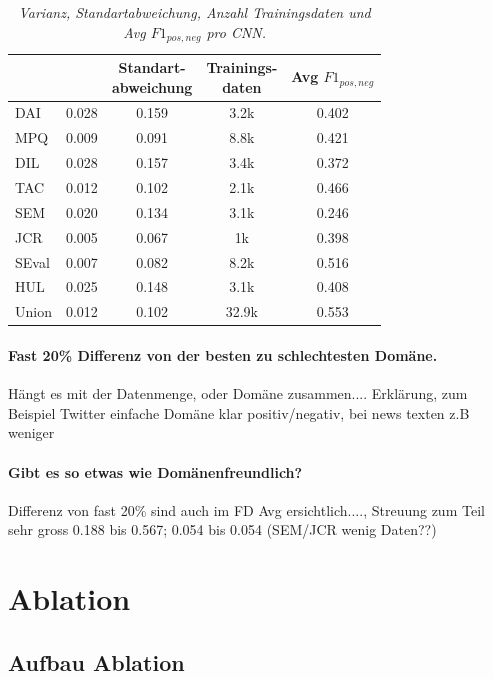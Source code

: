 \begin{table}[!t]
	\centering
	\small
	\begin{tabular}{l|cccc}
		&\specialcell{Varianz}&\specialcell{Standart-\\abweichung}    &\specialcell{Trainings-\\daten}  & \specialcell{Avg \\$F1_{pos,neg}$}\\
		\hline
		DAI &0.028&	0.159&	3.2k	&0.402\\
		MPQ	&0.009&	0.091&	8.8k  	&0.421\\
		DIL	&0.028&	0.157&	3.4k  	&0.372\\
		TAC	&0.012&	0.102&	2.1k  	&0.466\\
		SEM	&0.020&	0.134&	3.1k  	&0.246\\
		JCR	&0.005&	0.067&	1k 		&0.398\\
		SEval&0.007&0.082&	8.2k  	&0.516\\
		HUL	&0.025&	0.148&	3.1k 	&0.408\\
		Union &0.012&0.102&	32.9k	&0.553
		
	\end{tabular}
	\caption{\textit{Varianz, Standartabweichung, Anzahl Trainingsdaten und Avg $F1_{pos,neg}$ pro CNN.}}
	\label{tbl:varianz}
\end{table}
\paragraph{Fast 20\% Differenz von der besten zu schlechtesten Domäne.} Hängt es mit der Datenmenge, oder Domäne zusammen....
Erklärung, zum Beispiel Twitter einfache Domäne klar positiv/negativ, bei news texten z.B weniger
\paragraph{Gibt es so etwas wie Domänenfreundlich?} Differenz von fast 20\% sind auch im FD Avg ersichtlich...., Streuung zum Teil sehr gross 0.188 bis 0.567; 0.054 bis 0.054 (SEM/JCR wenig Daten??)

\section{Ablation}
\subsection{Aufbau Ablation}
